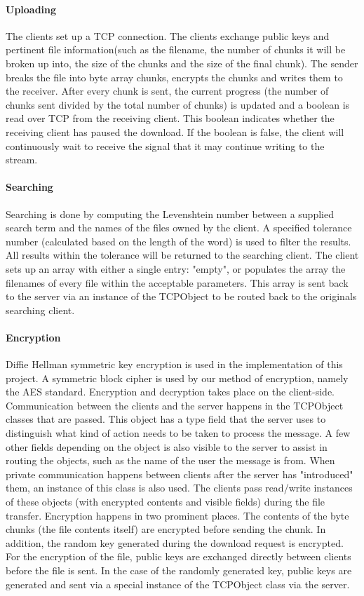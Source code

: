 \documentclass[12pt, a4paper]{article}
\begin{document}
\paragraph{Uploading}
The clients set up a TCP connection. The clients exchange public keys and pertinent file information(such as the filename, the number of chunks it will be broken up into, the size of the chunks and the size of the final chunk). The sender breaks the file into byte array chunks, encrypts the chunks and writes them to the receiver. After every chunk is sent, the current progress (the number of chunks sent divided by the total number of chunks) is updated and a boolean is read over TCP from the receiving client. This boolean indicates whether the receiving client has paused the download. If the boolean is false, the client will continuously wait to receive the signal that it may continue writing to the stream.

\paragraph{Searching}
Searching is done by computing the Levenshtein number between a supplied search term and the names of the files owned by the client. A specified tolerance number (calculated based on the length of the word) is used to filter the results. All results within the tolerance will be returned to the searching client. The client sets up an array with either a single entry: "empty", or populates the array the filenames of every file within the acceptable parameters. This array is sent back to the server via an instance of the TCPObject to be routed back to the originals searching client.

\paragraph{Encryption}
Diffie Hellman symmetric key encryption is used in the implementation of this project. A symmetric block cipher is used by our method of encryption, namely the AES standard. Encryption and decryption takes place on the client-side. Communication between the clients and the server happens in the TCPObject classes that are passed. This object has a type field that the server uses to distinguish what kind of action needs to be taken to process the message. A few other fields depending on the object is also visible to the server to assist in routing the objects, such as the name of the user the message is from. When private communication happens between clients after the server has "introduced" them, an instance of this class is also used. The clients pass read/write instances of these objects (with encrypted contents and visible fields) during the file transfer. Encryption happens in two prominent places. The contents of the byte chunks (the file contents itself) are encrypted before sending the chunk. In addition, the random key generated during the download request is encrypted. For the encryption of the file, public keys are exchanged directly between clients before the file is sent. In the case of the randomly generated key, public keys are generated and sent via a special instance of the TCPObject class via the server.
\end{document}
